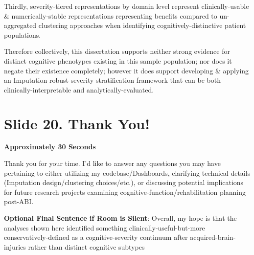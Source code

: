 \documentclass[
  11pt,
]{article}
\begin{document}
Thirdly, severity-tiered representations by domain level represent
clinically-usable \& numerically-stable representations representing
benefits compared to un-aggregated clustering approaches when
identifying cognitively-distinctive patient populations.

Therefore collectively, this dissertation supports neither strong
evidence for distinct cognitive phenotypes existing in this sample
population; nor does it negate their existence completely; however it
does support developing \& applying an Imputation-robust
severity-stratification framework that can be both
clinically-interpretable and analytically-evaluated.

\section{Slide 20. Thank You!}\label{slide-20.-thank-you}

\textbf{Approximately 30 Seconds}

Thank you for your time. I'd like to answer any questions you may have
pertaining to either utilizing my codebase/Dashboards, clarifying
technical details (Imputation design/clustering choices/etc.), or
discussing potential implications for future research projects examining
cognitive-function/rehabilitation planning post-ABI.

\textbf{Optional Final Sentence if Room is Silent}: Overall, my hope is
that the analyses shown here identified something
clinically-useful-but-more conservatively-defined as a
cognitive-severity continuum after acquired-brain-injuries rather than
distinct cognitive subtypes
\end{document}
